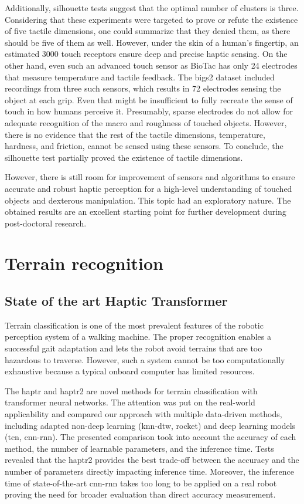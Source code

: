 \documentclass[a4paper, 10pt, twoside]{report}
\begin{document}
Additionally, silhouette tests suggest that the optimal number of clusters is three. Considering that these experiments were targeted to prove or refute the existence of five tactile dimensions, one could summarize that they denied them, as there should be five of them as well. However, under the skin of a human's fingertip, an estimated 3000 touch receptors ensure deep and precise haptic sensing. On the other hand, even such an advanced touch sensor as BioTac has only 24 electrodes that measure temperature and tactile feedback. The \acrshort{bigs2} dataset included recordings from three such sensors, which results in 72 electrodes sensing the object at each grip. Even that might be insufficient to fully recreate the sense of touch in how humans perceive it. Presumably, sparse electrodes do not allow for adequate recognition of the macro and roughness of touched objects. However, there is no evidence that the rest of the tactile dimensions, \ie temperature, hardness, and friction, cannot be sensed using these sensors. To conclude, the silhouette test partially proved the existence of tactile dimensions. 

However, there is still room for improvement of sensors and algorithms to ensure accurate and robust haptic perception for a high-level understanding of touched objects and dexterous manipulation. This topic had an exploratory nature. The obtained results are an excellent starting point for further development during post-doctoral research.

\chapter{Terrain recognition}
\label{part:conclusions:terrain}

\section{State of the art Haptic Transformer} 

Terrain classification is one of the most prevalent features of the robotic perception system of a walking machine. The proper recognition enables a successful gait adaptation and lets the robot avoid terrains that are too hazardous to traverse. However, such a system cannot be too computationally exhaustive because a typical onboard computer has limited resources.

The \acrshort{haptr} and \acrshort{haptr}2 are novel methods for terrain classification with transformer neural networks. The attention was put on the real-world applicability and compared our approach with multiple data-driven methods, including adapted non-deep learning (\acrshort{knn}-\acrshort{dtw}, \acrshort{rocket}) and deep learning models (\acrshort{tcn}, \acrshort{cnn}-\acrshort{rnn}). The presented comparison took into account the accuracy of each method, the number of learnable parameters, and the inference time. Tests revealed that the \acrshort{haptr}2 provides the best trade-off between the accuracy and the number of parameters directly impacting inference time. Moreover, the inference time of state-of-the-art \acrshort{cnn}-\acrshort{rnn} takes too long to be applied on a real robot proving the need for broader evaluation than direct accuracy measurement. 
\end{document}
